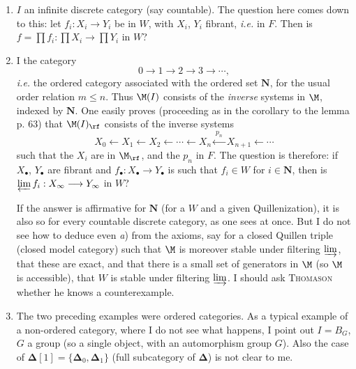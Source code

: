 \begin{enumerate}
\item[\textit{a})] $I$ an infinite discrete category (say countable). The question here comes down to this: let $f_i : X_i \longrightarrow Y_i$ be in $W$, with $X_i$, $Y_i$ fibrant, \textit{i.e.} in $F$. Then is $f = \prod f_i : \prod X_i \longrightarrow \prod Y_i$ in $W$?


\item[\textit{b})] I the category %
\[
0 \longrightarrow 1 \longrightarrow 2 \longrightarrow 3 \longrightarrow \cdots,
\]
\textit{i.e.} the ordered category associated with the ordered set $\mathbf{N}$, for the usual order relation $m \leq n$. Thus $\M(I)$ consists of the \textit{inverse} systems in $\M$, indexed by $\mathbf{N}$. One easily proves (proceeding as in the corollary to the lemma p. 63) that $\M(I)_{\rf}$ consists of the inverse systems
\[
X_0 \longleftarrow X_1 \longleftarrow X_2 \longleftarrow \cdots \longleftarrow X_n \xleftarrow{\ p_n\ } X_{n+1} \longleftarrow \cdots
\]
such that the $X_i$ are in $\M_{\rf}$, and the $p_n$ in $F$. The question is therefore: if $X_\bullet$, $Y_\bullet$ are fibrant and $f_\bullet : X_\bullet \longrightarrow Y_\bullet$ is such that $f_i \in W$ for $i \in \mathbf{N}$, then is $\varprojlim f_i : X_\infty \longrightarrow Y_\infty$ in $W$?

If the answer is affirmative for $\mathbf{N}$ (for a $W$ and a given Quillenization), it %
is also so for every countable discrete category, as one sees at once. But I do not see how to deduce even \textit{a}) from the axioms, say for a closed Quillen triple (closed model category) such that $\M$ is moreover stable under filtering $\varinjlim$, that these are exact, and that there is
a small set of generators in $\M$ (so $\M$ is accessible), that $W$ is stable under filtering $\varinjlim$. I should ask \textsc{Thomason} whether he knows a counterexample. %

\item[\textit{c})] The two preceding examples were ordered categories. As a typical example of a non-ordered category, where I do not see what happens, I point out $I = B_G$, $G$ a group (so a single object, with an automorphism group $G$). Also the case of $\boldsymbol{\Delta}[1] = \{\boldsymbol{\Delta}_0, \boldsymbol{\Delta}_1\}$ (full subcategory of $\boldsymbol{\Delta}$) is not clear to me.
\end{enumerate}

